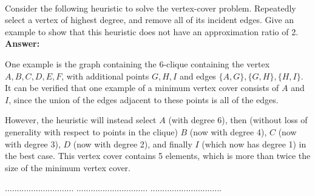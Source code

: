 \documentclass[a4paper,11pt]{article}
\begin{document}
\\
Consider the following heuristic to solve the vertex-cover
problem. Repeatedly select a vertex of highest degree, and remove all of its incident
edges. Give an example to show that this heuristic does not have
an approximation ratio of 2.\\
{\bf Answer:} \par
One example is the graph containing the 6-clique containing the vertex $A, B, C, D, E, F$, with additional points $G, H, I$ and edges $\{ A, G \}, \{ G, H \}, \{ H, I \}$. It can be verified that one example of a minimum vertex cover consists of $A$ and $I$, since the union of the edges adjacent to these points is all of the edges. \par
However, the heuristic will instead select $A$ (with degree 6), then (without loss of generality with respect to points in the clique) $B$ (now with degree 4), $C$ (now with degree 3), $D$ (now with degree 2), and finally $I$ (which now has degree 1) in the best case. This vertex cover contains 5 elements, which is more than twice the size of the minimum vertex cover.

\pagebreak

 $.............................$
 $..............................$
          $..............................$\\

\bigskip
\end{document}
